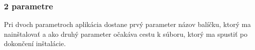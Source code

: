 \subsubsection{2 parametre}
Pri dvoch parametroch aplikácia dostane prvý parameter názov balíčku, ktorý ma nainštalovať a ako druhý parameter očakáva cestu k súboru, ktorý ma spustiť po dokončení inštalácie.


